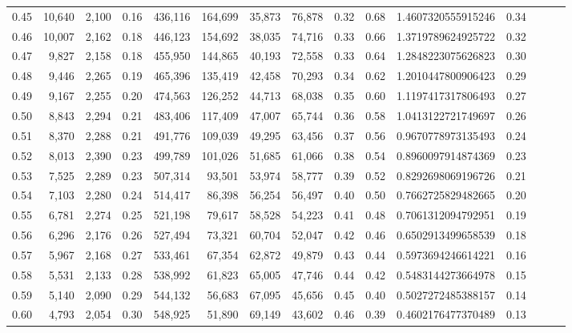 \begin{tabular}{rrrrrrrrrrrrrrr}
0.45 &  10,640 &  2,100 &  0.16 &  436,116 &  164,699 &   35,873 &   76,878 &  0.32 &  0.68 &    1.4607320555915246 &      0.34 \\
0.46 &  10,007 &  2,162 &  0.18 &  446,123 &  154,692 &   38,035 &   74,716 &  0.33 &  0.66 &    1.3719789624925722 &      0.32 \\
0.47 &   9,827 &  2,158 &  0.18 &  455,950 &  144,865 &   40,193 &   72,558 &  0.33 &  0.64 &    1.2848223075626823 &      0.30 \\
0.48 &   9,446 &  2,265 &  0.19 &  465,396 &  135,419 &   42,458 &   70,293 &  0.34 &  0.62 &    1.2010447800906423 &      0.29 \\
0.49 &   9,167 &  2,255 &  0.20 &  474,563 &  126,252 &   44,713 &   68,038 &  0.35 &  0.60 &    1.1197417317806493 &      0.27 \\
0.50 &   8,843 &  2,294 &  0.21 &  483,406 &  117,409 &   47,007 &   65,744 &  0.36 &  0.58 &    1.0413122721749697 &      0.26 \\
0.51 &   8,370 &  2,288 &  0.21 &  491,776 &  109,039 &   49,295 &   63,456 &  0.37 &  0.56 &    0.9670778973135493 &      0.24 \\
0.52 &   8,013 &  2,390 &  0.23 &  499,789 &  101,026 &   51,685 &   61,066 &  0.38 &  0.54 &    0.8960097914874369 &      0.23 \\
0.53 &   7,525 &  2,289 &  0.23 &  507,314 &   93,501 &   53,974 &   58,777 &  0.39 &  0.52 &    0.8292698069196726 &      0.21 \\
0.54 &   7,103 &  2,280 &  0.24 &  514,417 &   86,398 &   56,254 &   56,497 &  0.40 &  0.50 &    0.7662725829482665 &      0.20 \\
0.55 &   6,781 &  2,274 &  0.25 &  521,198 &   79,617 &   58,528 &   54,223 &  0.41 &  0.48 &    0.7061312094792951 &      0.19 \\
0.56 &   6,296 &  2,176 &  0.26 &  527,494 &   73,321 &   60,704 &   52,047 &  0.42 &  0.46 &    0.6502913499658539 &      0.18 \\
0.57 &   5,967 &  2,168 &  0.27 &  533,461 &   67,354 &   62,872 &   49,879 &  0.43 &  0.44 &    0.5973694246614221 &      0.16 \\
0.58 &   5,531 &  2,133 &  0.28 &  538,992 &   61,823 &   65,005 &   47,746 &  0.44 &  0.42 &    0.5483144273664978 &      0.15 \\
0.59 &   5,140 &  2,090 &  0.29 &  544,132 &   56,683 &   67,095 &   45,656 &  0.45 &  0.40 &    0.5027272485388157 &      0.14 \\
0.60 &   4,793 &  2,054 &  0.30 &  548,925 &   51,890 &   69,149 &   43,602 &  0.46 &  0.39 &    0.4602176477370489 &      0.13 \\

\end{tabular}
